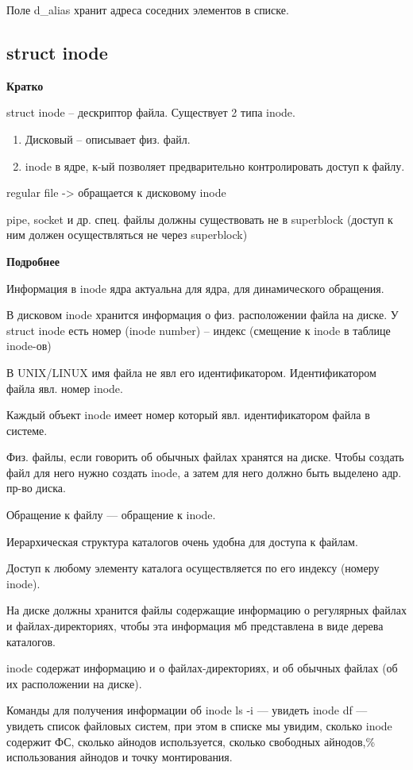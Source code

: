 Поле d\_alias хранит адреса соседних элементов в списке.

\subsection{struct inode}

\textbf{Кратко}

struct inode -- дескриптор файла. Существует 2 типа inode.
\begin{enumerate}
    \item Дисковый -- описывает физ. файл.
    \item inode в ядре, к-ый позволяет предварительно контролировать доступ к файлу.
\end{enumerate}

regular file -> обращается к дисковому inode

pipe, socket и др. спец. файлы должны существовать не в superblock (доступ к ним должен осуществляться не через superblock)

\textbf{Подробнее}

Информация в inode ядра актуальна для ядра, для динамического обращения.

В дисковом inode хранится информация о физ. расположении файла на диске. У struct inode есть номер (inode number) -- индекс (смещение к inode в таблице inode-ов)

В UNIX/LINUX имя файла не явл его идентификатором. Идентификатором файла явл. номер inode.

Каждый объект inode имеет номер который явл. идентификатором файла в системе.

Физ. файлы, если говорить об обычных файлах хранятся на диске. Чтобы создать файл для него нужно создать inode, а затем для него должно быть выделено адр. пр-во диска.

Обращение к файлу --- обращение к inode.

Иерархическая структура каталогов очень удобна для доступа к файлам.

Доступ к любому элементу каталога осуществляется по его индексу (номеру inode).

На диске должны хранится файлы содержащие информацию о регулярных файлах и файлах-директориях, чтобы  эта информация мб представлена в виде дерева каталогов.

inode содержат информацию и о файлах-директориях, и об обычных файлах (об их расположении на диске).

Команды для получения информации об inode
ls -i --- увидеть inode
df --- увидеть список файловых систем, при этом в списке мы увидим, сколько inode содержит ФС, сколько айнодов используется, сколько свободных айнодов,\% использования айнодов и точку монтирования.

